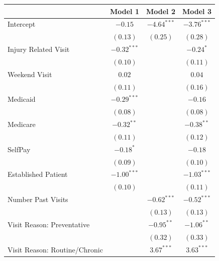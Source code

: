 \documentclass[12pt,twoside]{reedthesis}
\begin{document}
  \begin{table}
  \begin{center}
  \begin{small}
  \begin{tabular}{l c c c }
  \hline
   & Model 1 & Model 2 & Model 3 \\
  \hline
  Intercept                     & $-0.15$       & $-4.64^{***}$ & $-3.76^{***}$ \\
                                & $(0.13)$      & $(0.25)$      & $(0.28)$      \\
  Injury Related Visit          & $-0.32^{***}$ &               & $-0.24^{*}$   \\
                                & $(0.10)$      &               & $(0.11)$      \\
  Weekend Visit                 & $0.02$        &               & $0.04$        \\
                                & $(0.11)$      &               & $(0.16)$      \\
  Medicaid                      & $-0.29^{***}$ &               & $-0.16$       \\
                                & $(0.08)$      &               & $(0.08)$      \\
  Medicare                      & $-0.32^{**}$  &               & $-0.38^{**}$  \\
                                & $(0.11)$      &               & $(0.12)$      \\
  SelfPay                       & $-0.18^{*}$   &               & $-0.18$       \\
                                & $(0.09)$      &               & $(0.10)$      \\
  Established Patient           & $-1.00^{***}$ &               & $-1.03^{***}$ \\
                                & $(0.10)$      &               & $(0.11)$      \\
  Number Past Visits            &               & $-0.62^{***}$ & $-0.52^{***}$ \\
                                &               & $(0.13)$      & $(0.13)$      \\
  Visit Reason: Preventative    &               & $-0.95^{**}$  & $-1.06^{**}$  \\
                                &               & $(0.32)$      & $(0.33)$      \\
  Visit Reason: Routine/Chronic &               & $3.67^{***}$  & $3.63^{***}$  \\

\end{tabular}
\end{small}
\end{center}
\end{table}
\end{document}
